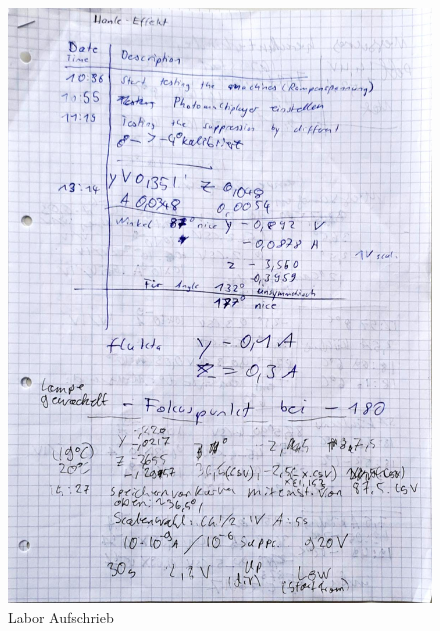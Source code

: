 \begin{figure}
	\includegraphics[scale=0.35]{Bild/Lab1}
	\centering
	\caption{Labor Aufschrieb}
\end{figure}
